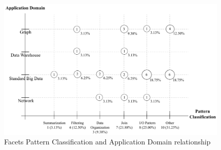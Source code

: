 \begin{figure}[hbtp]
\centering
\includegraphics[width=0.99\textwidth]{figs/Patterns-Domain.pdf}
\caption{Facets Pattern
Classification and Application Domain relationship}
\label{fig:patterns-domain}
\end{figure}
          
